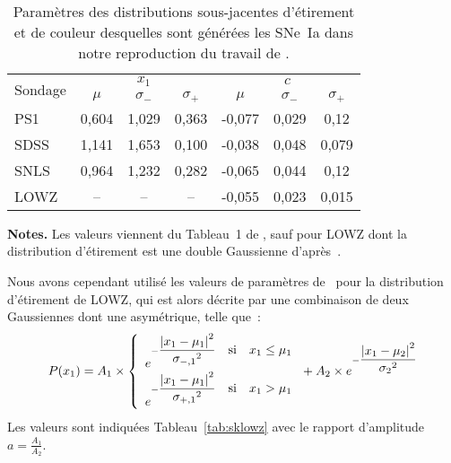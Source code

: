 \documentclass[../main/main.tex]{subfiles}
\begin{document}
\begin{table}[h]
    \centering
    \begin{threeparttable}
        \caption[Paramètres des distributions d'étirement et de couleur pour les
        simulations SK]{Paramètres des distributions sous-jacentes d'étirement
            et de couleur desquelles sont générées les SNe~Ia dans notre
        reproduction du travail de .}
        \label{tab:skasym}
        \begin{tabular}{lcccccc}
            \toprule
            \multirow{2}[2]{*}{Sondage} &
            \multicolumn{3}{c}{$x_1$} &
            \multicolumn{3}{c}{$c$}\\
            \cmidrule(lr){2-4} \cmidrule(lr){5-7} &
            $\mu$ & $\sigma_-$ & $\sigma_+$ &
            $\mu$ & $\sigma_-$ & $\sigma_+$ \\
            \midrule
            PS1    &
            0,604  & 1,029 & 0,363   &
            -0,077 & 0,029 & 0,12\\
            SDSS   &
            1,141  & 1,653 & 0,100   &
            -0,038 & 0,048 & 0,079\\
            SNLS   &
            0,964  & 1,232 & 0,282   &
            -0,065 & 0,044 & 0,12\\
            LOWZ   &
            --     & --    & --      &
            -0,055 & 0,023 & 0,015\\
            \bottomrule
        \end{tabular}
        \begin{tablenotes}[flushleft]
        \item\small \textbf{\hspace{-3,2pt}Notes.} Les valeurs viennent du
            Tableau~1 de , sauf pour LOWZ dont la
            distribution d'étirement est une double Gaussienne
            d'après~\cite{scolnic2018}.
        \end{tablenotes}
    \end{threeparttable}
\end{table}

Nous avons cependant utilisé les valeurs de paramètres de~\cite{scolnic2018}
pour la distribution d'étirement de LOWZ, qui est alors décrite par une
combinaison de deux Gaussiennes dont une asymétrique, telle que~:
\begin{equation}\label{eq:sklowz}
    P(x_1) = A_1\times
        \left\{
        \begin{array}{l}
            e^{-\displaystyle\frac{\abs{x_1-\mu_1}^2}{\sigma_{-,1}{}^2}
                \quad\text{si}\quad x_1\leq\mu_1} \\
            e^{-\displaystyle\frac{\abs{x_1-\mu_1}^2}{\sigma_{+,1}{}^2}
                \quad\text{si}\quad x_1>\mu_1} \\
        \end{array}
        \right. + A_2\times
        e^{-\displaystyle\frac{\abs{x_1-\mu_2}^2}{\sigma_{2}{}^2}}
\end{equation}
Les valeurs sont indiquées Tableau~\ref{tab:sklowz} avec le rapport d'amplitude
$a=\frac{A_1}{A_2}$. 
\end{document}

